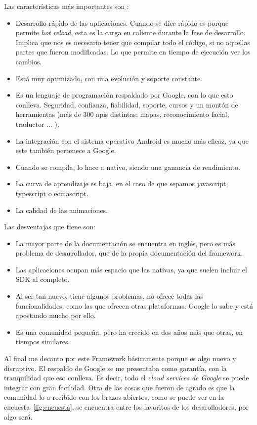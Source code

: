 Las características más importantes son : 

\begin{itemize}
	\item Desarrollo rápido de las aplicaciones. Cuando se dice rápido es porque permite \emph{hot reload}, esta es la carga en caliente durante la fase de desarrollo. Implica que nos es necesario tener que compilar todo el código, si no aquellas partes que fueron modificadas. Lo que permite en tiempo de ejecución ver los cambios.
	\item Está muy optimizado, con una evolución y soporte constante.
	\item Es un lenguaje de programación respaldado por Google, con lo que esto conlleva. Seguridad, confianza, fiabilidad, soporte, cursos y un montón de herramientas (más de 300 apis distintas: mapas, reconocimiento facial, traductor ... ).
	\item La integración con el sistema operativo Android es mucho más eficaz, ya que este también pertenece a Google.
	\item Cuando se compila, lo hace a nativo, siendo una ganancia de rendimiento.
	\item La curva de aprendizaje es baja, en el caso de que sepamos javascript, typescript o ecmascript.
	\item La calidad de las animaciones.
\end{itemize}

Las desventajas que tiene son:
\begin{itemize}
	\item La mayor parte de la documentación se encuentra en inglés, pero es más problema de desarrollador, que de la propia documentación del framework.
	\item Las aplicaciones ocupan más espacio que las nativas, ya que suelen incluir el SDK al completo.
	\item Al ser tan nuevo, tiene algunos problemas, no ofrece todas las funcionalidades, como las que ofrecen otras plataformas. Google lo sabe y está apostando mucho por ello.
	\item Es una comunidad pequeña, pero ha crecido en dos años más que otras, en tiempos similares.
\end{itemize}

Al final me decanto por este Framework básicamente porque es algo nuevo y disruptivo. El respaldo de Google se me presentaba como garantía, con la tranquilidad que eso conlleva. Es decir, todo el \emph{cloud services de Google} se puede integrar con gran facilidad.
Otra de las cosas que fueron de agrado es que la comunidad lo a recibido con los brazos abiertos, como se puede ver en la encuesta~\ref{fig:encuesta}, se encuentra entre los favoritos de los desarolladores, por algo será.

